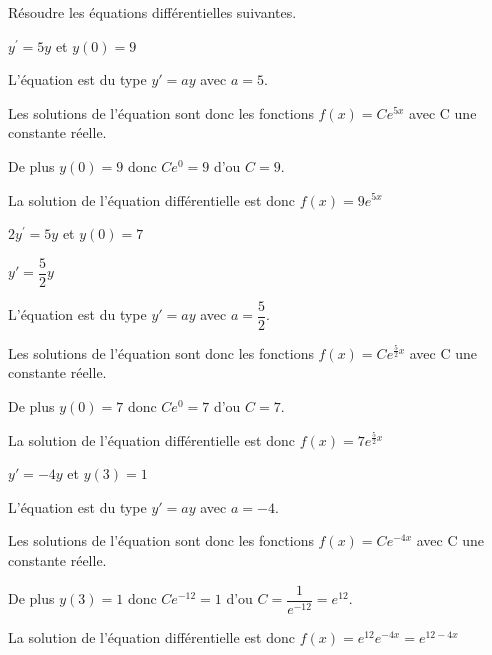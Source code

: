 \documentclass[11pt,a4paper]{article}  %
\begin{document}
\vspace*{-0.7cm}

Résoudre les équations différentielles suivantes.
	\begin{enumMet}
		\item $y^{\prime}=5y$ et $y(0)=9$
		\begin{corrBox}
			L'équation est du type $y'=ay$ avec $a=5$. 
			
			Les solutions de l'équation sont donc les fonctions $f(x)=Ce^{5x}$ avec C une constante réelle.	
			
			De plus $y(0)=9$ donc $Ce^{0}=9$ d'ou $C=9$.
			
			La solution de l'équation différentielle est donc $f(x)=9e^{5x}$	
		\end{corrBox}
		\item $2y^{\prime}=5 y$ et $y(0)=7$
		\begin{corrBox}
			$y'=\dfrac{5}{2}y$
			
			L'équation est du type $y'=ay$ avec $a=\dfrac{5}{2}$. 
			
			Les solutions de l'équation sont donc les fonctions $f(x)=Ce^{\frac{5}{2}x}$ avec C une constante réelle.	
			
			De plus $y(0)=7$ donc $Ce^{0}=7$ d'ou $C=7$.
			
			La solution de l'équation différentielle est donc $f(x)=7e^{\frac{5}{2}x}$	
		\end{corrBox}
		\item $y'=-4 y$ et $y(3)=1$
		\begin{corrBox}
			L'équation est du type $y'=ay$ avec $a=-4$. 
			
			Les solutions de l'équation sont donc les fonctions $f(x)=Ce^{-4x}$ avec C une constante réelle.	
			
			De plus $y(3)=1$ donc $Ce^{-12}=1$ d'ou $C=\dfrac{1}{e^{-12}}=e^{12}$.
			
			La solution de l'équation différentielle est donc $f(x)=e^{12}e^{-4x}=e^{12-4x}$	
		\end{corrBox}
	\end{enumMet}
	
\end{document}
